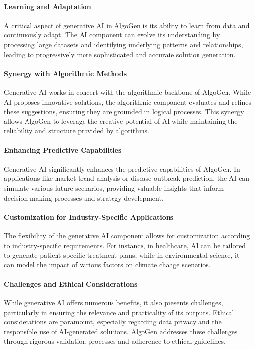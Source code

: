 \documentclass{article}
\begin{document}
\paragraph{Learning and Adaptation}
A critical aspect of generative AI in AlgoGen is its ability to learn from data and continuously adapt. The AI component can evolve its understanding by processing large datasets and identifying underlying patterns and relationships, leading to progressively more sophisticated and accurate solution generation.

\paragraph{Synergy with Algorithmic Methods}
Generative AI works in concert with the algorithmic backbone of AlgoGen. While AI proposes innovative solutions, the algorithmic component evaluates and refines these suggestions, ensuring they are grounded in logical processes. This synergy allows AlgoGen to leverage the creative potential of AI while maintaining the reliability and structure provided by algorithms.

\paragraph{Enhancing Predictive Capabilities}
Generative AI significantly enhances the predictive capabilities of AlgoGen. In applications like market trend analysis or disease outbreak prediction, the AI can simulate various future scenarios, providing valuable insights that inform decision-making processes and strategy development.

\paragraph{Customization for Industry-Specific Applications}
The flexibility of the generative AI component allows for customization according to industry-specific requirements. For instance, in healthcare, AI can be tailored to generate patient-specific treatment plans, while in environmental science, it can model the impact of various factors on climate change scenarios.

\paragraph{Challenges and Ethical Considerations}
While generative AI offers numerous benefits, it also presents challenges, particularly in ensuring the relevance and practicality of its outputs. Ethical considerations are paramount, especially regarding data privacy and the responsible use of AI-generated solutions. AlgoGen addresses these challenges through rigorous validation processes and adherence to ethical guidelines.
\end{document}
